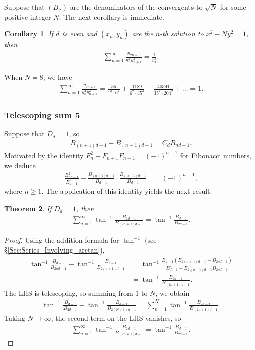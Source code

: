 \documentclass[12pt]{article}
\theoremstyle{plain}
\newtheorem{theorem}{Theorem}
\newtheorem{corollary}[theorem]{Corollary}
\theoremstyle{definition}
\theoremstyle{remark}
\begin{document}
Suppose that $ (B_\nu) $ are the denominators of the convergents to $ \sqrt{N} $ for some positive integer $ N $. The next corollary is immediate.
\begin{corollary} If $ d $ is even and $ (x_n, y_n) $ are the $ n $-th solution to $ x^2 - Ny^2 = 1 $, then
\begin{align*}
	\sum_{n = 1}^\infty \frac{y_{2n + 1}}{y_n^2 y_{n + 1}^2} = \frac{1}{y_1^3}.
\end{align*}
\end{corollary}
When $ N = 8 $, we have 
\begin{align*}
	\sum_{n = 1}^\infty \frac{y_{2n + 1}}{y_n^2 y_{n + 1}^2} = \frac{35}{1^2 \cdot 6^2} + \frac{1189}{6^2 \cdot 35^2} + \frac{40391}{35^2 \cdot 204^2} + \ldots = 1.
\end{align*}

\subsubsection{Telescoping sum 5}
Suppose that $ D_d = 1 $, so
\begin{align*}
B_{(n + 1)d - 1} - B_{(n - 1)d - 1} = C_d B_{nd - 1}.
\end{align*}
Motivated by the identity $ F_n^2 - F_{n + 1} F_{n - 1} = (-1)^{n - 1} $ for Fibonacci numbers, we deduce
\begin{align*}
\frac{B_{nd - 1}^2}{B_{d - 1}^2} - \frac{B_{(n + 1)d - 1}}{B_{d - 1}} \cdot \frac{B_{(n - 1)d - 1}}{B_{d - 1}} &= (-1)^{n - 1},
\end{align*}
where $ n \geq 1 $. The application of this identity yields the next result.
\begin{theorem} \label{Th:Telescoping_arctan} If $ D_d = 1 $, then
\begin{align*}
	\sum_{n = 1}^\infty \tan^{-1} \frac{B_{2d - 1}}{B_{(2n + 1)d - 1}} = \tan^{-1} \frac{B_{d - 1}}{B_{2d - 1}}.
\end{align*}
\end{theorem}

\begin{proof} Using the addition formula for $ \tan^{-1} $ (see \S \ref{Sec:Series_Involving_arctan}),
\begin{align*}
	\tan^{-1} \frac{B_{d - 1}}{B_{2nd - 1}} - \tan^{-1} \frac{B_{d - 1}}{B_{2(n + 1)d - 1}} &= \tan^{-1} \frac{B_{d - 1} (B_{2(n + 1)d - 1} - B_{2nd - 1})}{B_{d - 1}^2 + B_{2(n + 1)d - 1} B_{2nd - 1}} \\
	&= \tan^{-1} \frac{B_{2d - 1}}{B_{(2n + 1)d - 1}}.
\end{align*}
The LHS is telescoping, so summing from $ 1 $ to $ N $, we obtain
\begin{align*}
	\tan^{-1} \frac{B_{d - 1}}{B_{2d - 1}} - \tan^{-1} \frac{B_{d - 1}}{B_{2(N + 1)d - 1}} = \sum_{n = 1}^N \tan^{-1} \frac{B_{2d - 1}}{B_{(2n + 1)d - 1}}.
\end{align*}
Taking $ N \longrightarrow \infty $, the second term on the LHS vanishes, so
\begin{align*}
	\sum_{n = 1}^\infty \tan^{-1} \frac{B_{2d - 1}}{B_{(2n + 1)d - 1}} = \tan^{-1} \frac{B_{d - 1}}{B_{2d - 1}}.
\end{align*}
\end{proof}
\end{document}
